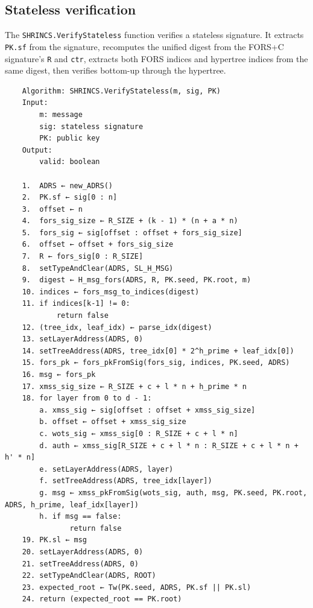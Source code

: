 \subsection{Stateless verification}
The \texttt{SHRINCS.VerifyStateless} function verifies a stateless signature. It extracts \texttt{PK.sf} from the signature, recomputes the unified digest from the FORS+C signature's \texttt{R} and \texttt{ctr}, extracts both FORS indices and hypertree indices from the same digest, then verifies bottom-up through the hypertree.
\begin{verbatim}
    Algorithm: SHRINCS.VerifyStateless(m, sig, PK)
    Input:
        m: message
        sig: stateless signature
        PK: public key
    Output:
        valid: boolean

    1.  ADRS ← new_ADRS()
    2.  PK.sf ← sig[0 : n]
    3.  offset ← n
    4.  fors_sig_size ← R_SIZE + (k - 1) * (n + a * n)
    5.  fors_sig ← sig[offset : offset + fors_sig_size]
    6.  offset ← offset + fors_sig_size
    7.  R ← fors_sig[0 : R_SIZE]
    8.  setTypeAndClear(ADRS, SL_H_MSG)
    9.  digest ← H_msg_fors(ADRS, R, PK.seed, PK.root, m)
    10. indices ← fors_msg_to_indices(digest)
    11. if indices[k-1] != 0:
            return false
    12. (tree_idx, leaf_idx) ← parse_idx(digest)
    13. setLayerAddress(ADRS, 0)
    14. setTreeAddress(ADRS, tree_idx[0] * 2^h_prime + leaf_idx[0])
    15. fors_pk ← fors_pkFromSig(fors_sig, indices, PK.seed, ADRS)
    16. msg ← fors_pk
    17. xmss_sig_size ← R_SIZE + c + l * n + h_prime * n
    18. for layer from 0 to d - 1:
        a. xmss_sig ← sig[offset : offset + xmss_sig_size]
        b. offset ← offset + xmss_sig_size
        c. wots_sig ← xmss_sig[0 : R_SIZE + c + l * n]
        d. auth ← xmss_sig[R_SIZE + c + l * n : R_SIZE + c + l * n + h' * n]
        e. setLayerAddress(ADRS, layer)
        f. setTreeAddress(ADRS, tree_idx[layer])
        g. msg ← xmss_pkFromSig(wots_sig, auth, msg, PK.seed, PK.root, ADRS, h_prime, leaf_idx[layer])
        h. if msg == false:
               return false
    19. PK.sl ← msg
    20. setLayerAddress(ADRS, 0)
    21. setTreeAddress(ADRS, 0)
    22. setTypeAndClear(ADRS, ROOT)
    23. expected_root ← Tw(PK.seed, ADRS, PK.sf || PK.sl)
    24. return (expected_root == PK.root)
\end{verbatim}

